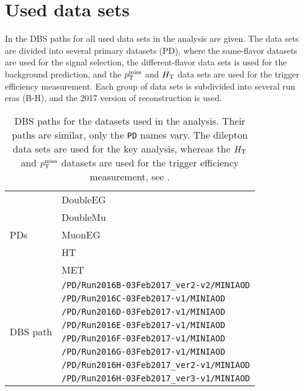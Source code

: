 \chapter{Used data sets}
In  the DBS paths for all used data sets in the analysis are given. The data sets are divided into several primary datasets (PD), where the same-flavor datasets are used for the signal selection, the different-flavor data sets is used for the background prediction, and the $p_{\mathrm{T}}^\text{miss}$ and $H_{\mathrm{T}}$ data sets are used for the trigger efficiency measurement. Each group of data sets is subdivided into several run eras (B-H), and the 2017 version of reconstruction is used.

\begin{table}[htb]
 \centering
 \caption{DBS paths for the datasets used in the analysis. Their paths are similar, only the \texttt{PD} names vary. The dilepton data sets are used for the key analysis, whereas the $H_{\mathrm{T}}$ and $p_{\mathrm{T}}^\text{miss}$ datasets are used for the trigger efficiency measurement, see .}
 \label{tab:app_datasets}
 \begin{tabular}{l|l}
  \hline
  \multirow{5}{*}{PDs}       & DoubleEG               \\
                             & DoubleMu               \\
                             & MuonEG                 \\
                             & HT                     \\
                             & MET                    \\\hline\hline
  \multirow{ 9}{*}{DBS path} & \verb|/PD/Run2016B-03Feb2017_ver2-v2/MINIAOD| \\
                             & \verb|/PD/Run2016C-03Feb2017-v1/MINIAOD| \\
                             & \verb|/PD/Run2016D-03Feb2017-v1/MINIAOD| \\
                             & \verb|/PD/Run2016E-03Feb2017-v1/MINIAOD| \\
                             & \verb|/PD/Run2016F-03Feb2017-v1/MINIAOD| \\
                             & \verb|/PD/Run2016G-03Feb2017-v1/MINIAOD| \\
                             & \verb|/PD/Run2016H-03Feb2017_ver2-v1/MINIAOD| \\
                             & \verb|/PD/Run2016H-03Feb2017_ver3-v1/MINIAOD| \\
  \hline
 \end{tabular}
\end{table}

